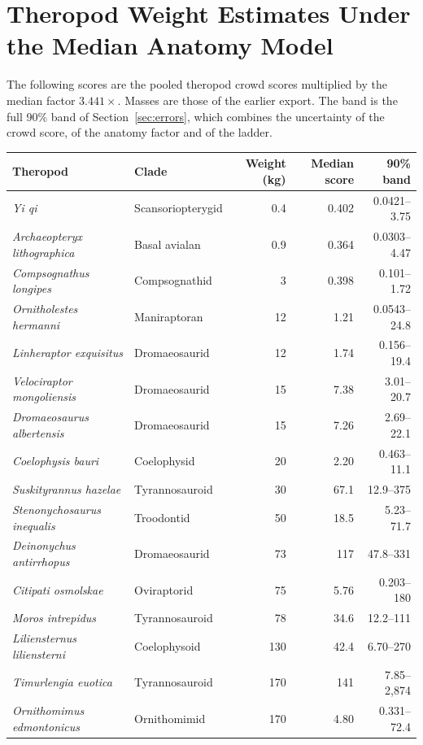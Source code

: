 \documentclass[11pt]{article}
\begin{document}
\appendix
\newpage
\section{Theropod Weight Estimates Under the Median Anatomy Model}
\label{app:theropod_weights}

The following scores are the pooled theropod crowd scores multiplied by the median factor $3.441\times$. Masses are those of the earlier export. The band is the full 90\% band of Section~\ref{sec:errors}, which combines the uncertainty of the crowd score, of the anatomy factor and of the ladder.

\small
\begin{longtable}{llrrr}
\toprule
Theropod & Clade & Weight (kg) & Median score & 90\% band \\
\midrule
\endhead
\textit{Yi qi} & Scansoriopterygid & 0.4 & 0.402 & 0.0421--3.75 \\
\textit{Archaeopteryx lithographica} & Basal avialan & 0.9 & 0.364 & 0.0303--4.47 \\
\textit{Compsognathus longipes} & Compsognathid & 3 & 0.398 & 0.101--1.72 \\
\textit{Ornitholestes hermanni} & Maniraptoran & 12 & 1.21 & 0.0543--24.8 \\
\textit{Linheraptor exquisitus} & Dromaeosaurid & 12 & 1.74 & 0.156--19.4 \\
\textit{Velociraptor mongoliensis} & Dromaeosaurid & 15 & 7.38 & 3.01--20.7 \\
\textit{Dromaeosaurus albertensis} & Dromaeosaurid & 15 & 7.26 & 2.69--22.1 \\
\textit{Coelophysis bauri} & Coelophysid & 20 & 2.20 & 0.463--11.1 \\
\textit{Suskityrannus hazelae} & Tyrannosauroid & 30 & 67.1 & 12.9--375 \\
\textit{Stenonychosaurus inequalis} & Troodontid & 50 & 18.5 & 5.23--71.7 \\
\textit{Deinonychus antirrhopus} & Dromaeosaurid & 73 & 117 & 47.8--331 \\
\textit{Citipati osmolskae} & Oviraptorid & 75 & 5.76 & 0.203--180 \\
\textit{Moros intrepidus} & Tyrannosauroid & 78 & 34.6 & 12.2--111 \\
\textit{Liliensternus liliensterni} & Coelophysoid & 130 & 42.4 & 6.70--270 \\
\textit{Timurlengia euotica} & Tyrannosauroid & 170 & 141 & 7.85--2,874 \\
\textit{Ornithomimus edmontonicus} & Ornithomimid & 170 & 4.80 & 0.331--72.4 \\

\end{longtable}
\end{document}
